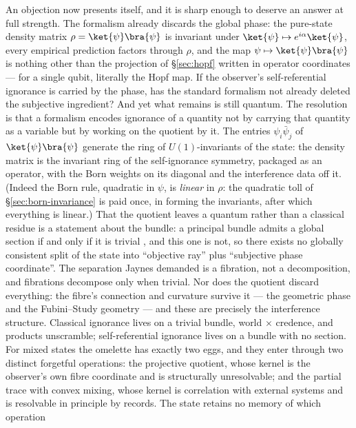 An objection now presents itself, and it is sharp enough to deserve an
answer at full strength. The formalism already discards the global
phase: the pure-state density matrix $\rho = \ket{\psi}\bra{\psi}$ is
invariant under $\ket{\psi} \mapsto e^{i\alpha}\ket{\psi}$, every
empirical prediction factors through $\rho$, and the map
$\psi \mapsto \ket{\psi}\bra{\psi}$ is nothing other than the
projection of \S\ref{sec:hopf} written in operator coordinates --- for
a single qubit, literally the Hopf map. If the observer's
self-referential ignorance is carried by the phase, has the standard
formalism not already deleted the subjective ingredient? And yet what
remains is still quantum. The resolution is that a formalism encodes
ignorance of a quantity not by carrying that quantity as a variable
but by working on the quotient by it. The entries $\psi_i\bar\psi_j$
of $\ket{\psi}\bra{\psi}$ generate the ring of $U(1)$-invariants of
the state: the density matrix is the invariant ring of the
self-ignorance symmetry, packaged as an operator, with the Born
weights on its diagonal and the interference data off it. (Indeed the
Born rule, quadratic in $\psi$, is \emph{linear} in $\rho$: the
quadratic toll of \S\ref{sec:born-invariance} is paid once, in forming the
invariants, after which everything is linear.) That the quotient
leaves a quantum rather than a classical residue is a statement about
the bundle: a principal bundle admits a global section if and only if
it is trivial \autocite{steenrod1951topology}, and this one is not, so
there exists no globally consistent split of the state into
``objective ray'' plus ``subjective phase coordinate''. The separation
Jaynes demanded \autocite{jaynes1990probability} is a fibration, not a
decomposition, and fibrations decompose only when trivial. Nor does
the quotient discard everything: the fibre's connection and curvature
survive it --- the geometric phase \autocite{berry1984quantal} and the
Fubini--Study geometry --- and these are precisely the interference
structure. Classical ignorance lives on a trivial bundle, world
$\times$ credence, and products unscramble; self-referential ignorance
lives on a bundle with no section.
For mixed states the omelette has exactly two eggs, and they enter
through two distinct forgetful operations: the projective quotient,
whose kernel is the observer's own fibre coordinate and is
structurally unresolvable; and the partial trace with convex mixing,
whose kernel is correlation with external systems and is resolvable in
principle by records. The state retains no memory of which operation
